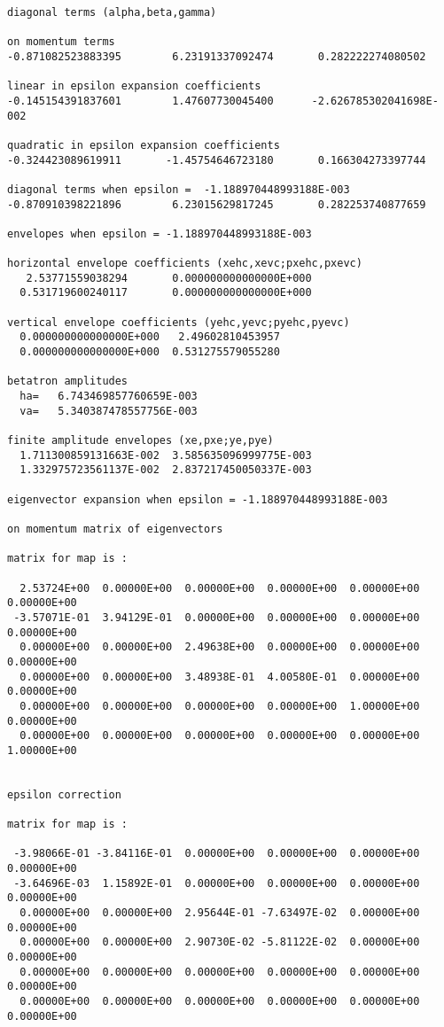\begin{footnotesize}
\begin{verbatim}
diagonal terms (alpha,beta,gamma)

on momentum terms
-0.871082523883395        6.23191337092474       0.282222274080502

linear in epsilon expansion coefficients
-0.145154391837601        1.47607730045400      -2.626785302041698E-002

quadratic in epsilon expansion coefficients
-0.324423089619911       -1.45754646723180       0.166304273397744

diagonal terms when epsilon =  -1.188970448993188E-003
-0.870910398221896        6.23015629817245       0.282253740877659

envelopes when epsilon = -1.188970448993188E-003

horizontal envelope coefficients (xehc,xevc;pxehc,pxevc)
   2.53771559038294       0.000000000000000E+000
  0.531719600240117       0.000000000000000E+000

vertical envelope coefficients (yehc,yevc;pyehc,pyevc)
  0.000000000000000E+000   2.49602810453957
  0.000000000000000E+000  0.531275579055280

betatron amplitudes
  ha=   6.743469857760659E-003
  va=   5.340387478557756E-003

finite amplitude envelopes (xe,pxe;ye,pye)
  1.711300859131663E-002  3.585635096999775E-003
  1.332975723561137E-002  2.837217450050337E-003

eigenvector expansion when epsilon = -1.188970448993188E-003

on momentum matrix of eigenvectors

matrix for map is :

  2.53724E+00  0.00000E+00  0.00000E+00  0.00000E+00  0.00000E+00  0.00000E+00
 -3.57071E-01  3.94129E-01  0.00000E+00  0.00000E+00  0.00000E+00  0.00000E+00
  0.00000E+00  0.00000E+00  2.49638E+00  0.00000E+00  0.00000E+00  0.00000E+00
  0.00000E+00  0.00000E+00  3.48938E-01  4.00580E-01  0.00000E+00  0.00000E+00
  0.00000E+00  0.00000E+00  0.00000E+00  0.00000E+00  1.00000E+00  0.00000E+00
  0.00000E+00  0.00000E+00  0.00000E+00  0.00000E+00  0.00000E+00  1.00000E+00


epsilon correction

matrix for map is :

 -3.98066E-01 -3.84116E-01  0.00000E+00  0.00000E+00  0.00000E+00  0.00000E+00
 -3.64696E-03  1.15892E-01  0.00000E+00  0.00000E+00  0.00000E+00  0.00000E+00
  0.00000E+00  0.00000E+00  2.95644E-01 -7.63497E-02  0.00000E+00  0.00000E+00
  0.00000E+00  0.00000E+00  2.90730E-02 -5.81122E-02  0.00000E+00  0.00000E+00
  0.00000E+00  0.00000E+00  0.00000E+00  0.00000E+00  0.00000E+00  0.00000E+00
  0.00000E+00  0.00000E+00  0.00000E+00  0.00000E+00  0.00000E+00  0.00000E+00



\end{verbatim}
\end{footnotesize}
